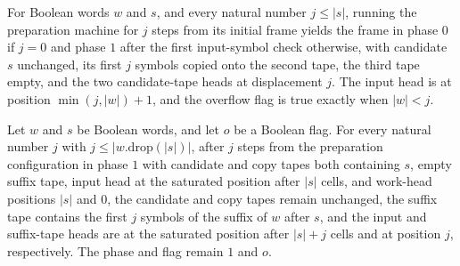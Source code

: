 \begin{lemma}
\label{Turing.FinTM.emitterP2_prepare_candidate}
\leanok
{}
For Boolean words $w$ and $s$, and every natural number $j\le |s|$, running the
preparation machine for $j$ steps from its initial frame yields the frame in phase $0$
if $j=0$ and phase $1$ after the first input-symbol check otherwise, with candidate $s$
unchanged, its first $j$ symbols copied onto the second tape, the third tape empty, and
the two candidate-tape heads at displacement $j$. The input head is at position
$\min(j,|w|)+1$, and the overflow flag is true exactly when $|w|<j$.
\end{lemma}

\begin{lemma}
\label{Turing.FinTM.emitterP2_prepare_suffix}
\leanok
{}
Let $w$ and $s$ be Boolean words, and let $o$ be a Boolean flag. For every natural
number $j$ with $j\leq |w.\mathrm{drop}(|s|)|$, after $j$ steps from the preparation
configuration in phase $1$ with candidate and copy tapes both containing $s$, empty
suffix tape, input head at the saturated position after $|s|$ cells, and work-head
positions $|s|$ and $0$, the candidate and copy tapes remain unchanged, the suffix tape
contains the first $j$ symbols of the suffix of $w$ after $s$, and the input and
suffix-tape heads are at the saturated position after $|s|+j$ cells and at position $j$,
respectively. The phase and flag remain $1$ and $o$.
\end{lemma}

